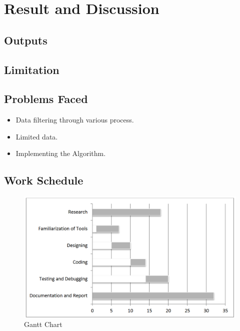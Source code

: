 \chapter{Result and Discussion}
\section{Outputs}

\section{Limitation}

 
\section{Problems Faced}
\begin{itemize}
\item Data filtering through various process. 
\item Limited data.
\item Implementing the Algorithm.
\end{itemize}
\newpage
\section{Work Schedule}
\begin{figure}[tbh] %
\begin{center}
	\includegraphics[width=5in]{images/gantt.png}
	\caption{Gantt Chart} %
	\label{Gantt chart} %
\end{center}
\end{figure}
\newpage
